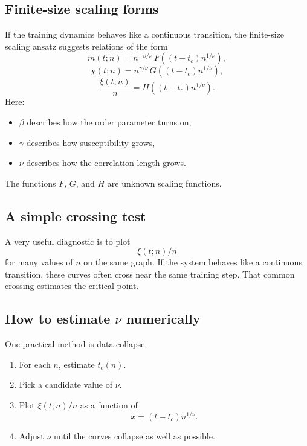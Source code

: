 \documentclass[11pt]{article}
\begin{document}
\subsection{Finite-size scaling forms}

If the training dynamics behaves like a continuous transition, the finite-size scaling ansatz suggests relations of the form
\begin{equation}
    m(t;n) = n^{-\beta/\nu} \, F\!\left((t-t_c)n^{1/\nu}\right),
\end{equation}
\begin{equation}
    \chi(t;n) = n^{\gamma/\nu} \, G\!\left((t-t_c)n^{1/\nu}\right),
\end{equation}
\begin{equation}
    \frac{\xi(t;n)}{n} = H\!\left((t-t_c)n^{1/\nu}\right).
\end{equation}
Here:
\begin{itemize}
    \item $\beta$ describes how the order parameter turns on,
    \item $\gamma$ describes how susceptibility grows,
    \item $\nu$ describes how the correlation length grows.
\end{itemize}
The functions $F$, $G$, and $H$ are unknown scaling functions.

\subsection{A simple crossing test}

A very useful diagnostic is to plot
\begin{equation}
    \xi(t;n)/n
\end{equation}
for many values of $n$ on the same graph. If the system behaves like a continuous transition, these curves often cross near the same training step. That common crossing estimates the critical point.

\subsection{How to estimate $\nu$ numerically}

One practical method is data collapse.

\begin{enumerate}
    \item For each $n$, estimate $t_c(n)$.
    \item Pick a candidate value of $\nu$.
    \item Plot $\xi(t;n)/n$ as a function of
    \begin{equation}
        x = (t-t_c)n^{1/\nu}.
    \end{equation}
    \item Adjust $\nu$ until the curves collapse as well as possible.
\end{enumerate}
\end{document}
